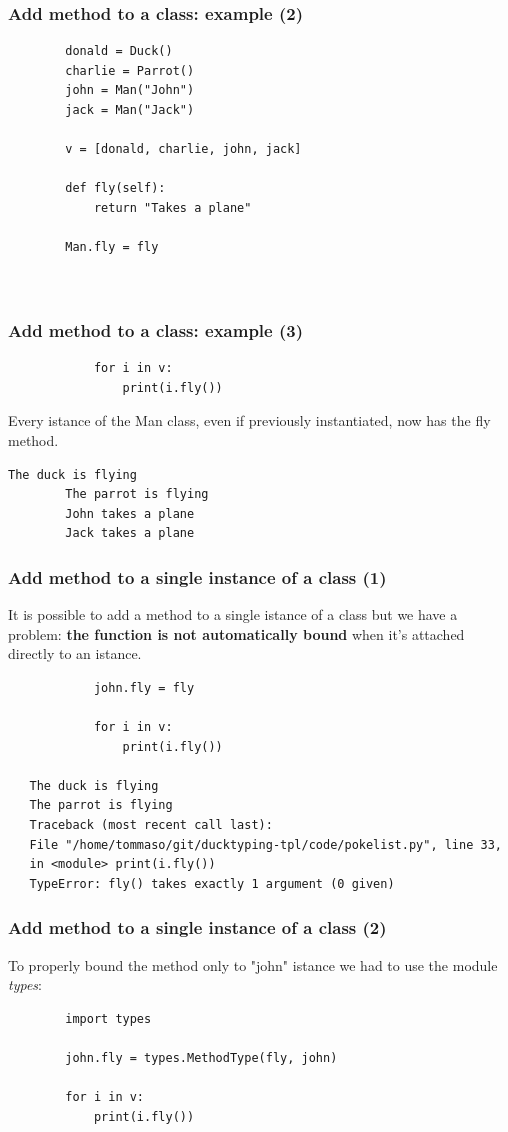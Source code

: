 \documentclass[xcolor ={table,usenames,dvipsnames}]{beamer}
\theoremstyle{definition}
\begin{document}
	\begin{frame}[fragile]
		\frametitle{Add method to a class: example (2)}
		\begin{lstlisting}
		donald = Duck()
		charlie = Parrot()
		john = Man("John")
		jack = Man("Jack")
		
		v = [donald, charlie, john, jack]
		
		def fly(self):
			return "Takes a plane"
		
		Man.fly = fly
		
		
		\end{lstlisting}
	\end{frame}

	\begin{frame}[fragile]
		\frametitle{Add method to a class: example (3)}
		\begin{lstlisting}
			for i in v:
				print(i.fly())
		\end{lstlisting}
		Every istance of the Man class, even if previously instantiated, now has the fly method.
		\begin{lstlisting}[keywordstyle=\color{black},
		commentstyle=\color{black},
		stringstyle=\color{black}.]	
		The duck is flying
		The parrot is flying
		John takes a plane
		Jack takes a plane
		\end{lstlisting}
	\end{frame}

	\begin{frame}[fragile]
		\frametitle{Add method to a single instance of a class (1)}
			It is possible to add a method to a single istance of a class but we have a problem: \textbf{the function is not automatically bound} when it's attached directly to an istance.
			
				\begin{lstlisting}
			john.fly = fly
			
			for i in v:
				print(i.fly())
				
   The duck is flying
   The parrot is flying
   Traceback (most recent call last):
   File "/home/tommaso/git/ducktyping-tpl/code/pokelist.py", line 33, 
   in <module> print(i.fly())
   TypeError: fly() takes exactly 1 argument (0 given)
			\end{lstlisting}
	\end{frame}
	
	\begin{frame}[fragile]
		\frametitle{Add method to a single instance of a class (2)}
			
		To properly bound the method only to "john" istance we had to use the module \textit{types}:
		
		\begin{lstlisting}
		import types
		
		john.fly = types.MethodType(fly, john)
		
		for i in v:
			print(i.fly())
		\end{lstlisting}
	\end{frame}
\end{document}
